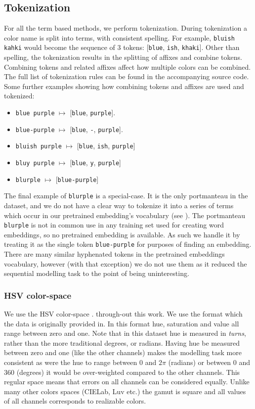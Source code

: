 \documentclass[11pt,a4paper]{article}
\newcommand{\parencite}{\citep}
\newcommand{\natlang}[1]{\texttt{#1}}
\begin{document}
\subsection{Tokenization}
For all the term based methods, we perform tokenization.
During tokenization a color name is split into terms, with consistent spelling.
For example, \natlang{bluish kahki} would become the sequence of 3 tokens: [\natlang{blue}, \natlang{ish}, \natlang{khaki}].
Other than spelling, the tokenization results in the splitting of affixes and combine tokens.
Combining tokens and related affixes affect how multiple colors can be combined.
The full list of tokenization rules can be found in the accompanying source code.
Some further examples showing how combining tokens and affixes are used and tokenized:
\begin{itemize}
	\item \natlang{blue purple} $\mapsto$ [\natlang{blue}, \natlang{purple}].
	\item \natlang{blue-purple} $\mapsto$ [\natlang{blue}, \natlang{-}, \natlang{purple}].
	\item \natlang{bluish purple} $\mapsto$ [\natlang{blue}, \natlang{ish}, \natlang{purple}]
	\item \natlang{bluy purple} $\mapsto$ [\natlang{blue}, \natlang{y}, \natlang{purple}]
	\item \natlang{blurple} $\mapsto$ [\natlang{blue-purple}]
\end{itemize}
The final example of \natlang{blurple} is a special-case.
It is the only portmanteau in the dataset, and we do not have a clear way to tokenize it into a series of terms which occur in our pretrained embedding's vocabulary (see ).
The portmanteau \natlang{blurple} is not in common use in any training set used for creating word embeddings, so no pretrained embedding is available.
As such we handle it by treating it as the single token \natlang{blue-purple} for purposes of finding an embedding.
There are many similar hyphenated tokens in the pretrained embeddings vocabulary, however (with that exception) we do not use them as it reduced the sequential modelling task to the point of being uninteresting.



\subsubsection{HSV color-space}
We use the HSV color-space \parencite{smith1978color}.
through-out this work.
We use the format which the data is originally provided in.
In this format hue, saturation and value all range between zero and one.
Note that in this dataset hue is measured in \emph{turns}, rather than the more traditional degrees, or radians.
Having hue be measured between zero and one (like the other channels) makes the modelling task more consistent as were the hue to range between $0$ and $2\pi$ (radians) or between $0$ and $360$ (degrees) it would be over-weighted compared to the other channels.
This regular space means that errors on all channels can be considered equally.
Unlike many other colors spaces (CIELab, Luv etc.) the gamut is square and all values of all channels corresponds to realizable colors.
\end{document}
